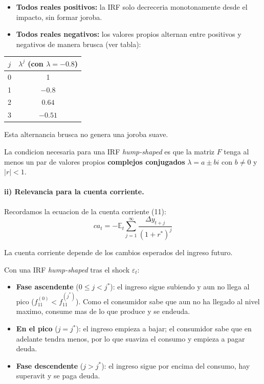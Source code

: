 \begin{itemize}
    \item \textbf{Todos reales positivos:} la IRF solo decreceria monotonamente desde el impacto, sin formar joroba.
    \item \textbf{Todos reales negativos:} los valores propios alternan entre positivos y negativos de manera brusca (ver tabla):
\end{itemize}

\begin{center}
\begin{tabular}{cc}
\hline
$j$ & $\lambda^j$ (con $\lambda = -0.8$) \\
\hline
0 & 1 \\
1 & $-0.8$ \\
2 & $0.64$ \\
3 & $-0.51$ \\
\hline
\end{tabular}
\end{center}

Esta alternancia brusca no genera una joroba suave.

\begin{resultado}
La condicion necesaria para una IRF \textit{hump-shaped} es que la matriz $F$ tenga al menos un par de valores propios \textbf{complejos conjugados} $\lambda = a \pm bi$ con $b \neq 0$ y $|r| < 1$.
\end{resultado}

\paragraph{ii) Relevancia para la cuenta corriente.}

Recordamos la ecuacion de la cuenta corriente (11):
\[
    ca_t = -\mathbb{E}_t \sum_{j=1}^{\infty} \frac{\Delta y_{t+j}}{(1+r^*)^j}
\]

La cuenta corriente depende de los cambios esperados del ingreso futuro.

Con una IRF \textit{hump-shaped} tras el shock $\varepsilon_t$:

\begin{itemize}
    \item \textbf{Fase ascendente} ($0 \leq j < j^*$): el ingreso sigue subiendo y aun no llega al pico ($f_{11}^{(0)} < f_{11}^{(j^*)}$). Como el consumidor sabe que aun no ha llegado al nivel maximo, consume mas de lo que produce y se endeuda.
    \item \textbf{En el pico} ($j = j^*$): el ingreso empieza a bajar; el consumidor sabe que en adelante tendra menos, por lo que suaviza el consumo y empieza a pagar deuda.
    \item \textbf{Fase descendente} ($j > j^*$): el ingreso sigue por encima del consumo, hay superavit y se paga deuda.
\end{itemize}

